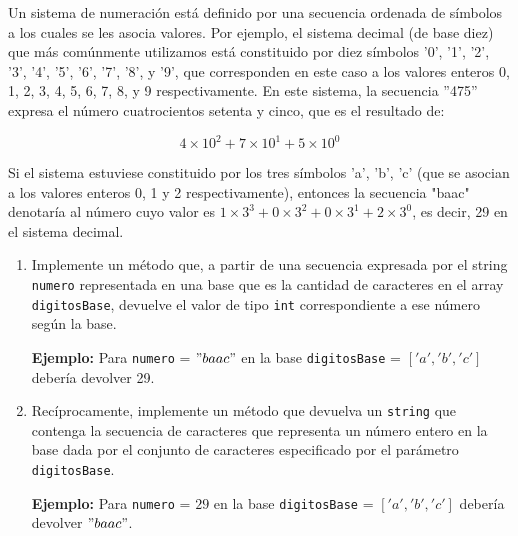 Un sistema de numeración está definido por una secuencia ordenada de símbolos a los cuales se les asocia valores. Por ejemplo, el sistema decimal (de base diez) que más comúnmente utilizamos está constituido por diez símbolos '0', '1', '2', '3', '4', '5', '6', '7', '8', y '9', que corresponden en este caso a los valores enteros 0, 1, 2, 3, 4, 5, 6, 7, 8, y 9 respectivamente. En este sistema, la secuencia ''475'' expresa el número cuatrocientos setenta y cinco, que es el resultado de:

\[
4 \times 10^2 + 7 \times 10^1 + 5 \times 10^0
\]

Si el sistema estuviese constituido por los tres símbolos 'a', 'b', 'c' (que se asocian a los valores enteros 0, 1 y 2 respectivamente), entonces la secuencia "baac" denotaría al número cuyo valor es \( 1 \times 3^3 + 0 \times 3^2 + 0 \times 3^1 + 2 \times 3^0 \), es decir, 29 en el sistema decimal.

\begin{enumerate}[label=\alph*)]
    \item Implemente un método que, a partir de una secuencia expresada por el string \texttt{numero} representada en una base que es la cantidad de caracteres en el array \texttt{digitosBase}, devuelve el valor de tipo \texttt{int} correspondiente a ese número según la base.

    \textbf{Ejemplo:}
    Para \texttt{numero} = $"baac"$ en la base \texttt{digitosBase} = $['a', 'b', 'c']$ debería devolver 29.

    \item Recíprocamente, implemente un método que devuelva un \texttt{string} que contenga la secuencia de caracteres que representa un número entero en la base dada por el conjunto de caracteres especificado por el parámetro \texttt{digitosBase}.

    \textbf{Ejemplo:}
    Para \texttt{numero} = $29$ en la base \texttt{digitosBase} = $['a', 'b', 'c']$ debería devolver $"baac"$.
\end{enumerate}